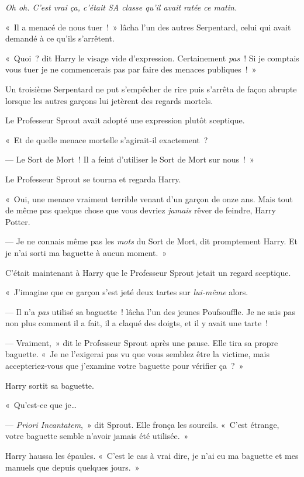 \emph{Oh oh. C'est vrai ça, c'était SA classe qu'il avait ratée ce matin.}

«~Il a menacé de nous tuer~!~» lâcha l'un des autres Serpentard, celui qui avait demandé à ce qu'ils s'arrêtent.

«~Quoi~? dit Harry le visage vide d'expression. Certainement \emph{pas}~! Si je comptais vous tuer je ne commencerais pas par faire des menaces publiques~!~»

Un troisième Serpentard ne put s'empêcher de rire puis s'arrêta de façon abrupte lorsque les autres garçons lui jetèrent des regards mortels.

Le Professeur Sprout avait adopté une expression plutôt sceptique.

«~Et de quelle menace mortelle s'agirait-il exactement~?

--- Le Sort de Mort~! Il a feint d'utiliser le Sort de Mort sur nous~!~»

Le Professeur Sprout se tourna et regarda Harry.

«~Oui, une menace vraiment terrible venant d'un garçon de onze ans. Mais tout de même pas quelque chose que vous devriez \emph{jamais} rêver de feindre, Harry Potter.

--- Je ne connais même pas les \emph{mots} du Sort de Mort, dit promptement Harry. Et je n'ai sorti ma baguette à aucun moment.~»

C'était maintenant à Harry que le Professeur Sprout jetait un regard sceptique.

«~J'imagine que ce garçon s'est jeté deux tartes sur \emph{lui-même} alors.

--- Il n'a \emph{pas} utilisé sa baguette~! lâcha l'un des jeunes Poufsouffle. Je ne sais pas non plus comment il a fait, il a claqué des doigts, et il y avait une tarte~!

--- Vraiment,~» dit le Professeur Sprout après une pause. Elle tira sa propre baguette. «~Je ne l'exigerai pas vu que vous semblez être la victime, mais accepteriez-vous que j'examine votre baguette pour vérifier ça~?~»

Harry sortit sa baguette.

«~Qu'est-ce que je…

--- \emph{Priori Incantatem},~» dit Sprout. Elle fronça les sourcils. «~C'est étrange, votre baguette semble n'avoir jamais été utilisée.~»

Harry haussa les épaules. «~C'est le cas à vrai dire, je n'ai eu ma baguette et mes manuels que depuis quelques jours.~»

